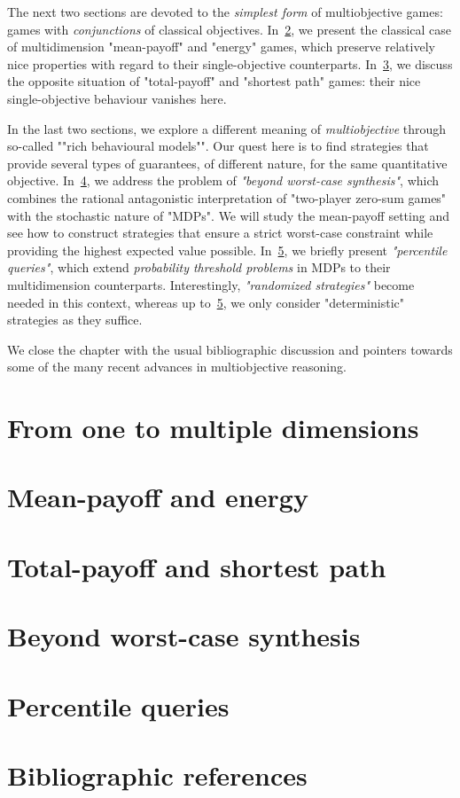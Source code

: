 The next two sections are devoted to the \emph{simplest form} of multiobjective games: games with \emph{conjunctions} of classical objectives. In~\cref{12-sec:mean_payoff_energy}, we present the classical case of multidimension "mean-payoff" and "energy" games, which preserve relatively nice properties with regard to their single-objective counterparts. In~\cref{12-sec:total_payoff_shortest_path}, we discuss the opposite situation of "total-payoff" and "shortest path" games: their nice single-objective behaviour vanishes here.

In the last two sections, we explore a different meaning of \emph{multiobjective} through so-called ""rich behavioural models"". Our quest here is to find strategies that provide several types of guarantees, of different nature, for the same quantitative objective. In~\cref{12-sec:beyond_worst_case}, we address the problem of \emph{"beyond worst-case synthesis"}, which combines the rational antagonistic interpretation of "two-player zero-sum games" with the stochastic nature of "MDPs". We will study the mean-payoff setting and see how to construct strategies that ensure a strict worst-case constraint while providing the highest expected value possible.
In~\cref{12-sec:percentile}, we briefly present \emph{"percentile queries"}, which extend \textit{probability threshold problems} in MDPs to their multidimension counterparts.  Interestingly, \emph{"randomized strategies"} become needed in this context, whereas up to~\cref{12-sec:percentile}, we only consider "deterministic" strategies as they suffice.

We close the chapter with the usual bibliographic discussion and pointers towards some of the many recent advances in multiobjective reasoning.

\section{From one to multiple dimensions}
\label{12-sec:multiple_dimensions}


\section{Mean-payoff and energy}
\label{12-sec:mean_payoff_energy}


\section{Total-payoff and shortest path}
\label{12-sec:total_payoff_shortest_path}


\section{Beyond worst-case synthesis}
\label{12-sec:beyond_worst_case}


\section{Percentile queries}
\label{12-sec:percentile}


\section*{Bibliographic references}
\label{12-sec:references}

